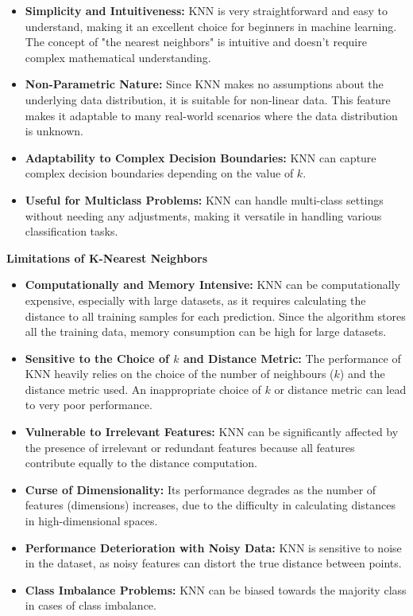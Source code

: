 \documentclass[letterpaper,10pt]{article}
\begin{document}
\begin{itemize}
    \item \textbf{Simplicity and Intuitiveness:} KNN is very straightforward and easy to understand, making it an excellent choice for beginners in machine learning. The concept of "the nearest neighbors" is intuitive and doesn't require complex mathematical understanding.


    \item \textbf{Non-Parametric Nature:} Since KNN makes no assumptions about the underlying data distribution, it is suitable for non-linear data. This feature makes it adaptable to many real-world scenarios where the data distribution is unknown.

    \item \textbf{Adaptability to Complex Decision Boundaries:} KNN can capture complex decision boundaries depending on the value of \( k \).

    \item \textbf{Useful for Multiclass Problems:} KNN can handle multi-class settings without needing any adjustments, making it versatile in handling various classification tasks.
\end{itemize}

\textbf{Limitations of K-Nearest Neighbors}

\begin{itemize}
    \item \textbf{Computationally and Memory Intensive:} KNN can be computationally expensive, especially with large datasets, as it requires calculating the distance to all training samples for each prediction. Since the algorithm stores all the training data, memory consumption can be high for large datasets.

    \item \textbf{Sensitive to the Choice of \( k \) and Distance Metric:} The performance of KNN heavily relies on the choice of the number of neighbours (\( k \)) and the distance metric used. An inappropriate choice of \( k \) or distance metric can lead to very poor performance.

    \item \textbf{Vulnerable to Irrelevant Features:} KNN can be significantly affected by the presence of irrelevant or redundant features because all features contribute equally to the distance computation.

    \item \textbf{Curse of Dimensionality:} Its performance degrades as the number of features (dimensions) increases, due to the difficulty in calculating distances in high-dimensional spaces.

    \item \textbf{Performance Deterioration with Noisy Data:} KNN is sensitive to noise in the dataset, as noisy features can distort the true distance between points.

    \item \textbf{Class Imbalance Problems:} KNN can be biased towards the majority class in cases of class imbalance.

\end{itemize}
\end{document}
